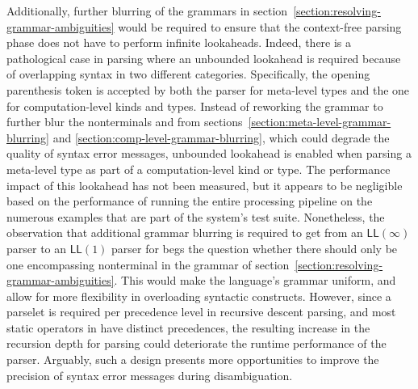 Additionally, further blurring of the grammars in section~\ref{section:resolving-grammar-ambiguities} would be required to ensure that the context-free parsing phase does not have to perform infinite lookaheads.
Indeed, there is a pathological case in parsing where an unbounded lookahead is required because of overlapping syntax in two different categories.
Specifically, the opening parenthesis token is accepted by both the parser for meta-level types and the one for computation-level kinds and types.
Instead of reworking the grammar to further blur the nonterminals  and  from sections~\ref{section:meta-level-grammar-blurring} and \ref{section:comp-level-grammar-blurring}, which could degrade the quality of syntax error messages, unbounded lookahead is enabled when parsing a meta-level type as part of a computation-level kind or type.
The performance impact of this lookahead has not been measured, but it appears to be negligible based on the performance of running the entire processing pipeline on the numerous examples that are part of the system's test suite.
Nonetheless, the observation that additional grammar blurring is required to get from an $ \mathsf{LL}(\infty) $ parser to an $ \mathsf{LL}(1) $ parser for \Beluga begs the question whether there should only be one encompassing nonterminal in the grammar of section~\ref{section:resolving-grammar-ambiguities}.
This would make the language's grammar uniform, and allow for more flexibility in overloading syntactic constructs.
However, since a parselet is required per precedence level in recursive descent parsing, and most static operators in \Beluga have distinct precedences, the resulting increase in the recursion depth for parsing could deteriorate the runtime performance of the parser.
Arguably, such a design presents more opportunities to improve the precision of syntax error messages during disambiguation.
